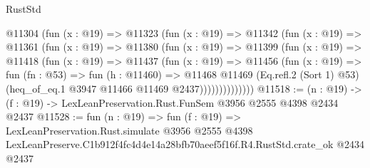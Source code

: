 \begin{lexlean}{RustStd}
\begin{coremodule}
          @11304
            (fun (x : @19) =>
            @11323
              (fun (x : @19) =>
              @11342
                (fun (x : @19) =>
                @11361
                  (fun (x : @19) =>
                  @11380
                    (fun (x : @19) =>
                    @11399
                      (fun (x : @19) =>
                      @11418
                        (fun (x : @19) =>
                        @11437
                          (fun (x : @19) =>
                          @11456
                            (fun (x : @19) =>
                            fun (fn : @53) =>
                            fun (h : @11460) =>
                            @11468
                              @11469
                              (Eq.refl.{2} (Sort 1) @53)
                              (heq_of_eq.{1} @3947 @11466 @11469 @2437))))))))))))))
@11518 := (n : @19) -> (f : @19) -> LexLeanPreservation.Rust.FunSem @3956 @2555 @4398 @2434 @2437
@11528 := fun (n : @19) =>
  fun (f : @19) =>
  LexLeanPreservation.Rust.simulate
    @3956
    @2555
    @4398
    LexLeanPreserve.C1b912f4fc4d4e14a28bfb70aeef5f16f.R4.RustStd.crate_ok
    @2434
    @2437
\end{coremodule}
\end{lexlean}
